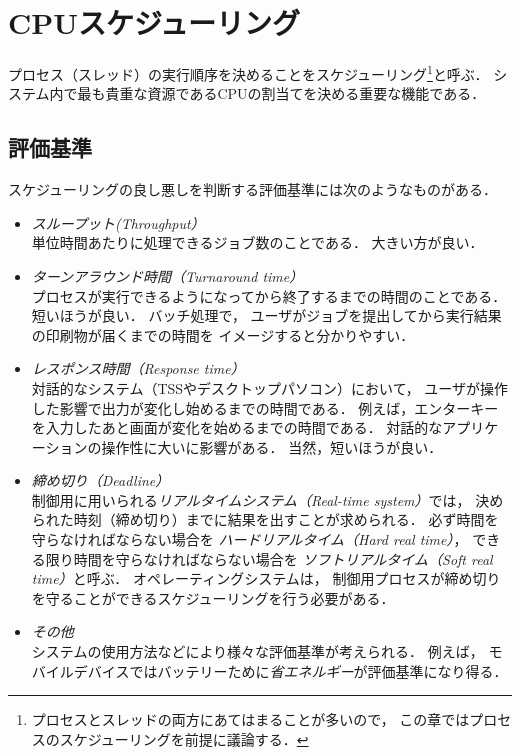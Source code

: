 \chapter{CPUスケジューリング}
プロセス（スレッド）の実行順序を決めることをスケジューリング\footnote{
プロセスとスレッドの両方にあてはまることが多いので，
この章ではプロセスのスケジューリングを前提に議論する．}と呼ぶ．
システム内で最も貴重な資源であるCPUの割当てを決める重要な機能である．

\section{評価基準}
スケジューリングの良し悪しを判断する評価基準には次のようなものがある．

\begin{itemize}
\item \emph{スループット(Throughput）} \\
  単位時間あたりに処理できるジョブ数のことである．
  大きい方が良い．
\item \emph{ターンアラウンド時間（Turnaround time）} \\
  プロセスが実行できるようになってから終了するまでの時間のことである．
  短いほうが良い．
  バッチ処理で，
  ユーザがジョブを提出してから実行結果の印刷物が届くまでの時間を
  イメージすると分かりやすい．
\item \emph{レスポンス時間（Response time）} \\
  対話的なシステム（TSSやデスクトップパソコン）において，
  ユーザが操作した影響で出力が変化し始めるまでの時間である．
  例えば，エンターキーを入力したあと画面が変化を始めるまでの時間である．
  対話的なアプリケーションの操作性に大いに影響がある．
  当然，短いほうが良い．
\item \emph{締め切り（Deadline）} \\
  制御用に用いられる\emph{リアルタイムシステム（Real-time system）}では，
  決められた時刻（締め切り）までに結果を出すことが求められる．
  必ず時間を守らなければならない場合を
  \emph{ハードリアルタイム（Hard real time）}，
  できる限り時間を守らなければならない場合を
  \emph{ソフトリアルタイム（Soft real time）}と呼ぶ．
  オペレーティングシステムは，
  制御用プロセスが締め切りを守ることができるスケジューリングを行う必要がある．
\item \emph{その他} \\
  システムの使用方法などにより様々な評価基準が考えられる．
  例えば，
  モバイルデバイスではバッテリーために\emph{省エネルギー}が評価基準になり得る．
\end{itemize}

